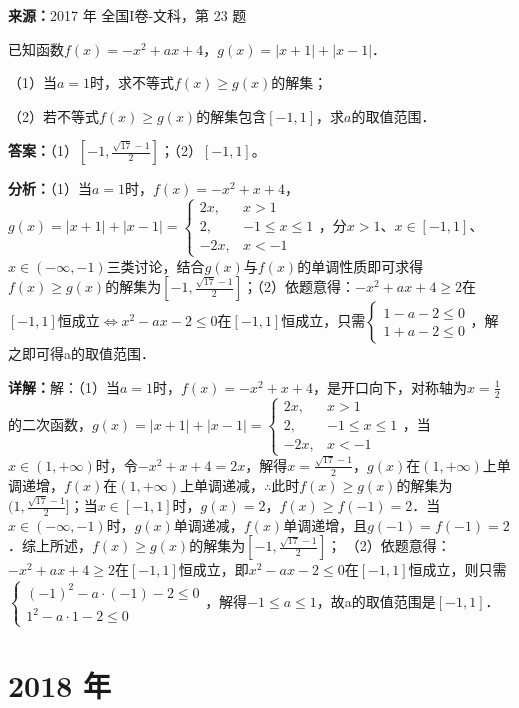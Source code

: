 \begin{question}[points=10]
\textbf{来源：}2017 年 全国I卷-文科，第 23 题\par
已知函数$f(x)=-x^2+ax+4$，$g(x)=|x+1|+|x-1|$．

（1）当$a=1$时，求不等式$f(x)\ge g(x)$的解集；

（2）若不等式$f(x)\ge g(x)$的解集包含$[-1,1]$，求$a$的取值范围．
\begin{solution}
\textbf{答案：}（1）$[-1,\frac{\sqrt{17}-1}{2}]$；（2）$[-1,1]$。

\textbf{分析：}（1）当$a=1$时，$f(x)=-x^2+x+4$，$g(x)=|x+1|+|x-1|=\begin{cases} 2x, & x>1 \\ 2, & -1\le x\le 1 \\ -2x, & x<-1 \end{cases}$，分$x>1$、$x\in[-1,1]$、$x\in(-\infty,-1)$三类讨论，结合$g(x)$与$f(x)$的单调性质即可求得$f(x)\ge g(x)$的解集为$[-1,\frac{\sqrt{17}-1}{2}]$；（2）依题意得：$-x^2+ax+4\ge2$在$[-1,1]$恒成立$\Leftrightarrow x^2-ax-2\le0$在$[-1,1]$恒成立，只需$\begin{cases} 1-a-2\le0 \\ 1+a-2\le0 \end{cases}$，解之即可得a的取值范围．

\textbf{详解：}解：（1）当$a=1$时，$f(x)=-x^2+x+4$，是开口向下，对称轴为$x=\frac{1}{2}$的二次函数，$g(x)=|x+1|+|x-1|=\begin{cases} 2x, & x>1 \\ 2, & -1\le x\le 1 \\ -2x, & x<-1 \end{cases}$，当$x\in(1,+\infty)$时，令$-x^2+x+4=2x$，解得$x=\frac{\sqrt{17}-1}{2}$，$g(x)$在$(1,+\infty)$上单调递增，$f(x)$在$(1,+\infty)$上单调递减，$\therefore$此时$f(x)\ge g(x)$的解集为$(1,\frac{\sqrt{17}-1}{2}]$；当$x\in[-1,1]$时，$g(x)=2$，$f(x)\ge f(-1)=2$．当$x\in(-\infty,-1)$时，$g(x)$单调递减，$f(x)$单调递增，且$g(-1)=f(-1)=2$．综上所述，$f(x)\ge g(x)$的解集为$[-1,\frac{\sqrt{17}-1}{2}]$；
（2）依题意得：$-x^2+ax+4\ge2$在$[-1,1]$恒成立，即$x^2-ax-2\le0$在$[-1,1]$恒成立，则只需$\begin{cases} (-1)^2-a\cdot(-1)-2\le0 \\ 1^2-a\cdot1-2\le0 \end{cases}$，解得$-1\le a\le1$，故a的取值范围是$[-1,1]$．
\end{solution}
\end{question}

\section*{2018 年}

